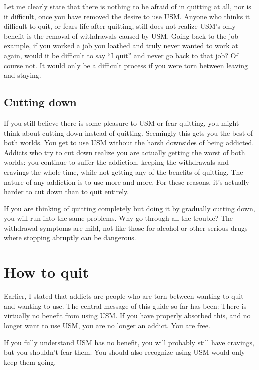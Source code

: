 \documentclass[
  openany]{book}
\newenvironment{rmdnote}{
\color{blue}
\begin{framed}}{\end{framed}}
\begin{document}
Let me clearly state that there is nothing to be afraid of in quitting at all, nor is it difficult, once you have removed the desire to use USM. Anyone who thinks it difficult to quit, or fears life after quitting, still does not realize USM's only benefit is the removal of withdrawals caused by USM. Going back to the job example, if you worked a job you loathed and truly never wanted to work at again, would it be difficult to say ``I quit'' and never go back to that job? Of course not. It would only be a difficult process if you were torn between leaving and staying.

\section{Cutting down}\label{cutting-down}

If you still believe there is some pleasure to USM or fear quitting, you might think about cutting down instead of quitting. Seemingly this gets you the best of both worlds. You get to use USM without the harsh downsides of being addicted. Addicts who try to cut down realize you are actually getting the worst of both worlds: you continue to suffer the addiction, keeping the withdrawals and cravings the whole time, while not getting any of the benefits of quitting. The nature of any addiction is to use more and more. For these reasons, it's actually harder to cut down than to quit entirely.

If you are thinking of quitting completely but doing it by gradually cutting down, you will run into the same problems. Why go through all the trouble? The withdrawal symptoms are mild, not like those for alcohol or other serious drugs where stopping abruptly can be dangerous.

\chapter{How to quit}\label{how-to-quit}

Earlier, I stated that addicts are people who are torn between wanting to quit and wanting to use. The central message of this guide so far has been: There is virtually no benefit from using USM. If you have properly absorbed this, and no longer want to use USM, you are no longer an addict. You are free.

\begin{rmdnote}
If you fully understand USM has no benefit, you will probably still have cravings, but you shouldn't fear them. You should also recognize using USM would only keep them going.

\end{rmdnote}
\end{document}

